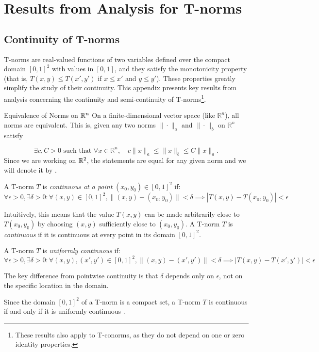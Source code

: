 \chapter{Results from Analysis for T-norms}

\section{Continuity of T-norms}
\label{app:cont_tnorms}
T-norms are real-valued functions of two variables defined over the compact domain $[0,1]^2$ with values in $[0,1]$, and they satisfy the monotonicity property (that is, $T(x,y) \le T(x',y')$ if $x \le x'$ and $y \le y'$). These properties greatly simplify the study of their continuity. This appendix presents key results from analysis concerning the continuity and semi-continuity of T-norms\footnote{These results also apply to T-conorms, as they do not depend on one or zero identity properties.}.

\begin{notation}{Equivalence of Norms on $\mathbb{R}^n$}
    On a finite-dimensional vector space (like $\mathbb{R}^n$), all norms are equivalent. This is, given any two norms $\|\cdot\|_a$ and $\|\cdot\|_b$ on $\mathbb{R}^n$ satisfy

 $$
 \exists c, C > 0 \text{ such that } \forall x \in \mathbb{R}^n, \quad c\|x\|_a \leq \|x\|_b \leq C\|x\|_a.
 $$
 Since we are working on $\mathbb{R}^2$, the statements are equal for any given norm and we will denote it by \say{$\|\cdot\|$}.
\end{notation}

\begin{definition}[Continuity]
A T-norm $T$ is \emph{continuous at a point} $(x_0, y_0) \in [0,1]^2$ if:
\[
\forall \epsilon > 0, \exists \delta > 0 : \forall (x,y) \in [0,1]^2, \|(x,y) - (x_0,y_0)\| < \delta \implies |T(x,y) - T(x_0,y_0)| < \epsilon
\]
\end{definition}

Intuitively, this means that the value $T(x,y)$ can be made arbitrarily close to $T(x_0,y_0)$ by choosing $(x,y)$ sufficiently close to $(x_0,y_0)$. A T-norm $T$ is \emph{continuous} if it is continuous at every point in its domain $[0,1]^2$.

\begin{definition}
A T-norm $T$ is \emph{uniformly continuous} if:
\[
\forall \epsilon > 0, \exists \delta > 0 : \forall (x,y),(x',y') \in [0,1]^2, \|(x,y) - (x',y')\| < \delta \implies |T(x,y) - T(x',y')| < \epsilon
\]
\end{definition}
The key difference from pointwise continuity is that $\delta$ depends only on $\epsilon$, not on the specific location in the domain.
\begin{remark}
    Since the domain $[0,1]^2$ of a T-norm is a compact set, a T-norm $T$ is continuous if and only if it is uniformly continuous \cite[p.~30]{Klement2000}.
\end{remark}

